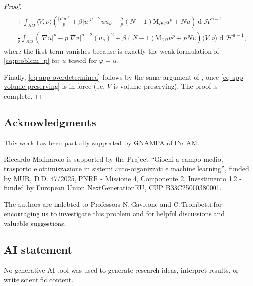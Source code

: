 \documentclass[10pt,a4paper, reqno]{amsart}
\numberwithin{equation}{section}
\renewcommand{\d}[1]{\ensuremath{\operatorname{d}\!{#1}}}
\begin{document}
\begin{proof}
\begin{equation*}
\begin{aligned}
            \\
            &+\int_{\partial\Omega}\langle V,\nu\rangle\left(\frac{|\nabla u|^p}{p}+\beta|u|^{p-2}uu_\nu+\frac{\beta}{p}(N-1)\mathrm{M}_{\partial\Omega}u^p+Nu\right)\d{}\mathcal{H}^{n-1}
            \\
            =&\frac{1}{p}\int_{\partial\Omega}\left(|\nabla u|^p-p|\nabla u|^{p-2}(u_\nu)^2+\beta(N-1)\mathrm{M}_{\partial\Omega}u^p+pNu\right)\langle V,\nu\rangle\d{}\mathcal{H}^{n-1},
        \end{aligned}
    \end{equation*}
    where the first term vanishes because is exactly the weak formulation of \eqref{eq:problem_p} for $u$ tested for $\varphi = \dot{u}$. 

    Finally, \eqref{eq app overdetermined} follows by the same argument of \cite[Theorem 4.1]{bw}, once \eqref{eq app volume preserving} is in force (i.e. $V$ is volume preserving). The proof is complete.
\end{proof}


\subsection*{Acknowledgments}
This work has been partially supported by GNAMPA of INdAM. 

\noindent
Riccardo Molinarolo is supported by the Project ``Giochi a campo medio, trasporto e ottimizzazione in sistemi auto-organizzati e machine learning”, funded by MUR, D.D. 47/2025, PNRR - Missione 4, Componente 2, Investimento 1.2 - funded by European Union NextGenerationEU, CUP B33C25000380001.

\noindent 
The authors are indebted to Professors N.\,Gavitone and C.\,Trombetti for encouraging us to investigate this problem and for helpful discussions and valuable suggestions. 

\subsection*{AI statement}
No generative AI tool was used to generate research ideas, interpret
results, or write scientific content.



\end{document}
